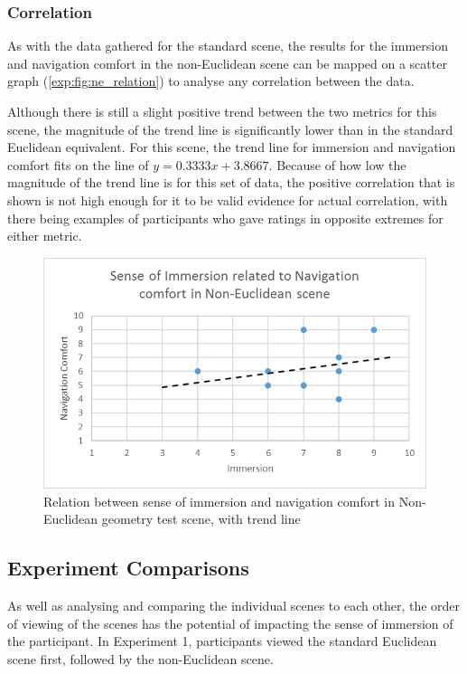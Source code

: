 			\subsubsection{Correlation}

				As with the data gathered for the standard scene, the results for the immersion and navigation comfort in the non-Euclidean scene can be mapped on a scatter graph (\autoref{exp:fig:ne_relation}) to analyse any correlation between the data.

				Although there is still a slight positive trend between the two metrics for this scene, the magnitude of the trend line is significantly lower than in the standard Euclidean equivalent.
				For this scene, the trend line for immersion and navigation comfort fits on the line of $y = 0.3333x + 3.8667$.
				Because of how low the magnitude of the trend line is for this set of data, the positive correlation that is shown is not high enough for it to be valid evidence for actual correlation, with there being examples of participants who gave ratings in opposite extremes for either metric.

				\begin{figure}[h]
					\includegraphics[width=1\textwidth]{Images/NE_Relation}
					\centering
					\caption{Relation between sense of immersion and navigation comfort in Non-Euclidean geometry test scene, with trend line}
					\label{exp:fig:ne_relation}
				\end{figure}

		\subsection{Experiment Comparisons}
		\label{exp:exp:comp}

			As well as analysing and comparing the individual scenes to each other, the order of viewing of the scenes has the potential of impacting the sense of immersion of the participant.
			In Experiment 1, participants viewed the standard Euclidean scene first, followed by the non-Euclidean scene.

